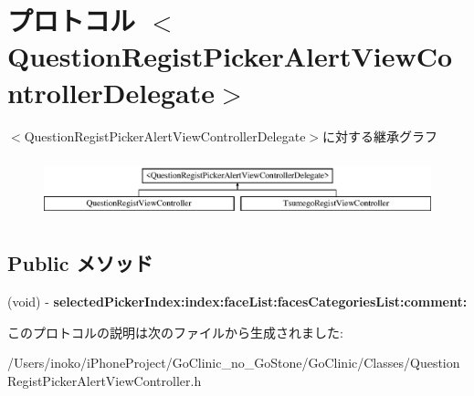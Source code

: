 \hypertarget{protocol_question_regist_picker_alert_view_controller_delegate-p}{
\section{プロトコル $<$QuestionRegistPickerAlertViewControllerDelegate$>$}
\label{protocol_question_regist_picker_alert_view_controller_delegate-p}
}
$<$QuestionRegistPickerAlertViewControllerDelegate$>$に対する継承グラフ\begin{figure}[H]
\begin{center}
\leavevmode
\includegraphics[height=1.777778cm]{protocol_question_regist_picker_alert_view_controller_delegate-p}
\end{center}
\end{figure}
\subsection*{Public メソッド}
\begin{DoxyCompactItemize}
\item 
\hypertarget{protocol_question_regist_picker_alert_view_controller_delegate-p_a1c8f3f71c2b3a414d3b2f351dead8fd3}{
(void) -\/ {\bfseries selectedPickerIndex:index:faceList:facesCategoriesList:comment:}}
\label{protocol_question_regist_picker_alert_view_controller_delegate-p_a1c8f3f71c2b3a414d3b2f351dead8fd3}

\end{DoxyCompactItemize}


このプロトコルの説明は次のファイルから生成されました:\begin{DoxyCompactItemize}
\item 
/Users/inoko/iPhoneProject/GoClinic\_\-no\_\-GoStone/GoClinic/Classes/QuestionRegistPickerAlertViewController.h\end{DoxyCompactItemize}
